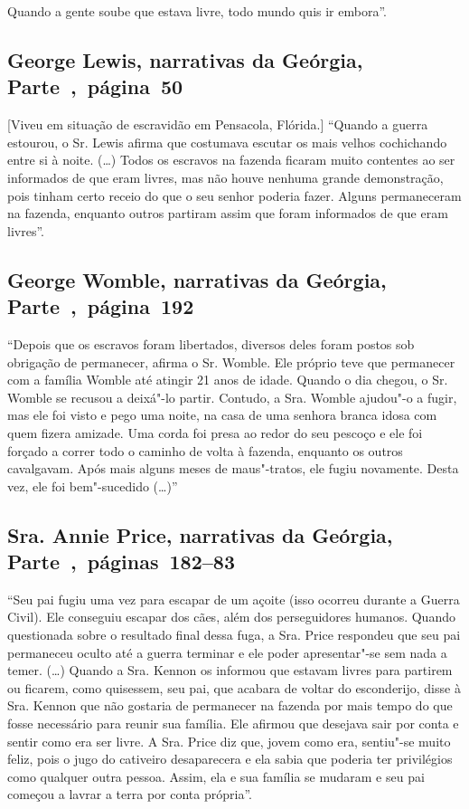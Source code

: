 Quando a gente soube que estava livre, todo mundo quis ir embora''.

\subsection{George Lewis, narrativas da Geórgia, Parte~,~página~50}
\label{ref175}

{[}Viveu em situação de escravidão em Pensacola, Flórida.{]} ``Quando a guerra estourou, o Sr. Lewis afirma que costumava escutar os
mais velhos cochichando entre si à noite. (\ldots{}) Todos os escravos
na fazenda ficaram muito contentes ao ser informados de que eram livres,
mas não houve nenhuma grande demonstração, pois tinham certo receio do
que o seu senhor poderia fazer. Alguns permaneceram na fazenda, enquanto
outros partiram assim que foram informados de que eram livres''.

\subsection{George Womble, narrativas da Geórgia, Parte~,~página~192}
\label{ref312}

``Depois que os escravos foram libertados, diversos deles foram postos
sob obrigação de permanecer, afirma o Sr. Womble. Ele próprio teve que
permanecer com a família Womble até atingir 21 anos de idade. Quando o
dia chegou, o Sr. Womble se recusou a deixá"-lo partir. Contudo, a Sra.
Womble ajudou"-o a fugir, mas ele foi visto e pego uma noite, na casa de
uma senhora branca idosa com quem fizera amizade. Uma corda foi presa ao
redor do seu pescoço e ele foi forçado a correr todo o caminho de volta
à fazenda, enquanto os outros cavalgavam. Após mais alguns meses de
maus"-tratos, ele fugiu novamente. Desta vez, ele foi bem"-sucedido
(\ldots{})''

\subsection{Sra. Annie Price, narrativas da Geórgia, Parte~,~páginas~182--83}
\label{ref214}

``Seu pai fugiu uma vez para escapar de um açoite (isso ocorreu durante
a Guerra Civil). Ele conseguiu escapar dos cães, além dos perseguidores
humanos. Quando questionada sobre o resultado final dessa fuga, a Sra.
Price respondeu que seu pai permaneceu oculto até a guerra terminar e
ele poder apresentar"-se sem nada a temer. (\ldots{}) Quando a Sra.
Kennon os informou que estavam livres para partirem ou ficarem, como
quisessem, seu pai, que acabara de voltar do esconderijo, disse à Sra.
Kennon que não gostaria de permanecer na fazenda por mais tempo do que
fosse necessário para reunir sua família. Ele afirmou que desejava sair
por conta e sentir como era ser livre. A Sra. Price diz que, jovem como
era, sentiu"-se muito feliz, pois o jugo do cativeiro desaparecera e ela
sabia que poderia ter privilégios como qualquer outra pessoa. Assim, ela
e sua família se mudaram e seu pai começou a lavrar a terra por conta
própria''.

